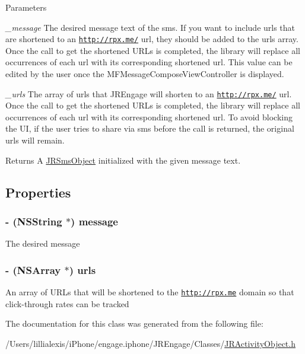 \begin{DoxyParams}{Parameters}
\item[{\em \_\-message}]The desired message text of the sms. If you want to include urls that are shortened to an \href{http://rpxnow.com/docs/iphone#shorten_urls}{\tt http://rpx.me/} url, they should be added to the {\ttfamily urls} array. Once the call to get the shortened URLs is completed, the library will replace all occurrences of each url with its corresponding shortened url. This value can be edited by the user once the MFMessageComposeViewController is displayed.\item[{\em \_\-urls}]The array of urls that JREngage will shorten to an \href{http://rpxnow.com/docs/iphone#shorten_urls}{\tt http://rpx.me/} url. Once the call to get the shortened URLs is completed, the library will replace all occurrences of each url with its corresponding shortened url. To avoid blocking the UI, if the user tries to share via sms before the call is returned, the original urls will remain.\end{DoxyParams}
\begin{DoxyReturn}{Returns}
A \hyperlink{interface_j_r_sms_object}{JRSmsObject} initialized with the given message text. 
\end{DoxyReturn}


\subsection{Properties}
\hypertarget{interface_j_r_sms_object_a6d74c049eba0e6ecfae0e25cffd77d6e}{
\subsubsection[{message}]{\setlength{\rightskip}{0pt plus 5cm}-\/ (NSString $\ast$) message}}
\label{interface_j_r_sms_object_a6d74c049eba0e6ecfae0e25cffd77d6e}
The desired message \hypertarget{interface_j_r_sms_object_a181c9385d2dc5ade8b096e2302a47a50}{
\subsubsection[{urls}]{\setlength{\rightskip}{0pt plus 5cm}-\/ (NSArray $\ast$) urls}}
\label{interface_j_r_sms_object_a181c9385d2dc5ade8b096e2302a47a50}
An array of URLs that will be shortened to the \href{http://rpx.me}{\tt http://rpx.me} domain so that click-\/through rates can be tracked \label{interface_j_r_sms_object_smsUrls}
\hypertarget{interface_j_r_sms_object_smsUrls}{}
 

The documentation for this class was generated from the following file:\begin{DoxyCompactItemize}
\item 
/Users/lillialexis/iPhone/engage.iphone/JREngage/Classes/\hyperlink{_j_r_activity_object_8h}{JRActivityObject.h}\end{DoxyCompactItemize}
